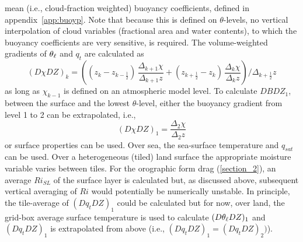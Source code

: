 \documentclass{UMDP_article}
\begin{document}
mean (\mbox{i.e.}, cloud-fraction weighted) buoyancy coefficients,
defined in appendix~\ref{app:buoyp}.  Note that because this is
defined on $\theta$-levels, no vertical interpolation of cloud
variables (fractional area and water contents), to which the buoyancy
coefficients are very sensitive, is required.  The volume-weighted
gradients of $\theta_{\ell}$ and $q_t$ are calculated as
\begin{equation}
  (D\chi DZ)_k =\left( (z_{k}-z_{k-\frac{1}{2}}) \, \frac{\Delta_{k+1} \chi}{\Delta_{k+1} z} +
    (z_{k+\frac{1}{2}}-z_{k}) \, \frac{\Delta_{k} \chi}{\Delta_{k} z}
  \right) / \Delta_{k+\frac{1}{2}} z
\label{gradient_interp}
\end{equation}
as long as $\chi_{k-1}$ is defined on an atmospheric model level. To calculate 
$DBDZ_1$, between the surface and the lowest $\theta$-level, either the buoyancy gradient
from level 1 to 2 can be extrapolated, \mbox{i.e.},
\begin{equation*}
  (D\chi DZ)_1 = \frac{\Delta_{2} \chi}{\Delta_{2} z} 
\end{equation*}
or surface properties can be used.  Over sea, the sea-surface temperature 
and $q_{sat}$ can be used.  Over a heterogeneous (tiled) land surface the 
appropriate moisture variable varies between tiles.  For the orographic form drag 
(\ref{section_2}), an average $Ri_{SL}$ of the surface layer is calculated but, as 
discussed above, subsequent vertical averaging of $Ri$ would potentially be 
numerically unstable.  In principle, the tile-average of $(Dq_t DZ)_1$ could 
be calculated but for now, over land, the grid-box average surface temperature is 
used to calculate $(D\theta_{\ell} DZ)_1$ and $(Dq_t DZ)_1$ is extrapolated from 
above (\mbox{i.e.}, $(Dq_t DZ)_1 = (Dq_t DZ)_2)$).
\end{document}
